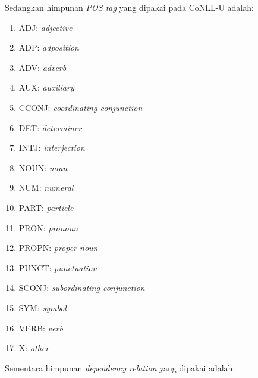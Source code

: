 Sedangkan himpunan \textit{POS tag} yang dipakai pada CoNLL-U adalah:
\begin{multicols}{2}
	\begin{enumerate}
		\item ADJ: \textit{adjective}
		\item ADP: \textit{adposition}
		\item ADV: \textit{adverb}
		\item AUX: \textit{auxiliary}
		\item CCONJ: \textit{coordinating conjunction}
		\item DET: \textit{determiner}
		\item INTJ: \textit{interjection}
		\item NOUN: \textit{noun}
		\item NUM: \textit{numeral}
		\item PART: \textit{particle}
		\item PRON: \textit{pronoun}
		\item PROPN: \textit{proper noun}
		\item PUNCT: \textit{punctuation}
		\item SCONJ: \textit{subordinating conjunction}
		\item SYM: \textit{symbol}
		\item VERB: \textit{verb}
		\item X: \textit{other}
	\end{enumerate}
\end{multicols}

Sementara himpunan \textit{dependency relation} yang dipakai adalah:

